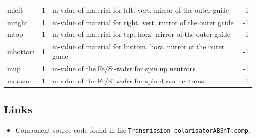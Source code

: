 \begin{longtable}{p{}p{}p{}p{}}
mleft & 1 & m-value of material for left.   vert. mirror of the outer guide & -1 \\
mright & 1 & m-value of material for right.  vert. mirror of the outer guide & -1 \\
mtop & 1 & m-value of material for top.    horz. mirror of the outer guide & -1 \\
mbottom & 1 & m-value of material for bottom. horz. mirror of the outer guide & -1 \\
mup & 1 & m-value of the Fe/Si-wafer for spin up neutrons & -1 \\
mdown & 1 & m-value of the Fe/Si-wafer for spin down neutrons & -1 \\
\bottomrule
\end{longtable}

\subsection*{Links}
\begin{itemize}
  \item Component source code found in file \texttt{Transmission\_polarisatorABSnT.comp}.
\end{itemize}
